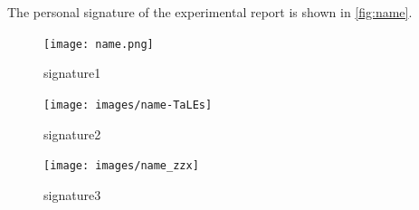The personal signature of the experimental report is shown in \cref{fig:name}.

\begin{figure}[H]
	\centering
	\begin{minipage}{0.3\textwidth}
		\centering
		\texttt{[image: name.png]}
		\caption{signature1}
		\label{fig:name}
	\end{minipage}
	\begin{minipage}{0.3\textwidth}
		\centering
		\texttt{[image: images/name-TaLEs]}
		\caption{signature2}
		\label{fig:name-tales}
	\end{minipage}
	\begin{minipage}{0.25\textwidth}
		\centering
		\label{fig:namemwc}
	\end{minipage}
	\begin{minipage}{0.3\textwidth}
		\centering
		\texttt{[image: images/name\_zzx]}
		\caption{signature3}
		\label{fig:namezzx}
	\end{minipage}
	
	\vspace{0.3cm} %
	

\end{figure}
